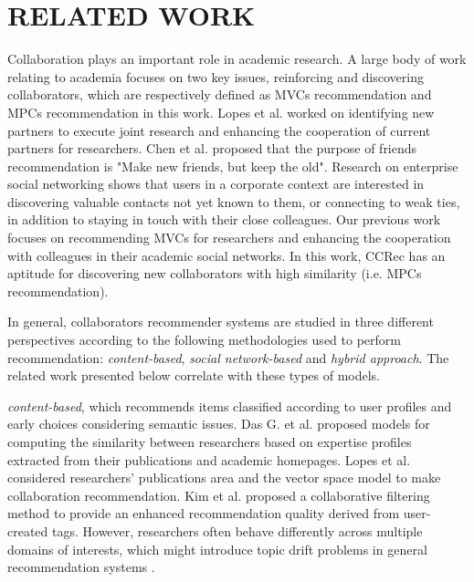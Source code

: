 \documentclass[review]{elsarticle}
\begin{document}
\section{RELATED WORK}
Collaboration plays an important role in academic research. A large body of work relating to academia focuses on two key issues, reinforcing and discovering collaborators, which are respectively defined as MVCs recommendation and MPCs recommendation in this work. Lopes et al. \cite{lopes2010collaboration} worked on identifying new partners to execute joint research and enhancing the cooperation of current partners for researchers. Chen et al. \cite{chen2009make} proposed that the purpose of friends recommendation is "Make new friends, but keep the old". Research on enterprise social networking \cite{dimicco2008motivations} shows that users in a corporate context are interested in discovering valuable contacts not yet known to them, or connecting to weak ties, in addition to staying in touch with their close colleagues. Our previous work \cite{li2014acrec} focuses on recommending MVCs for researchers and enhancing the cooperation with colleagues in their academic social networks. In this work, CCRec has an aptitude for discovering new collaborators with high similarity (i.e. MPCs recommendation).

In general, collaborators recommender systems are studied in three different perspectives according to the following methodologies used to perform recommendation: \emph{content-based}, \emph{social network-based} and \emph{hybrid approach}. The related work presented below correlate with these types of models.

\emph{content-based}, which recommends items classified according to user profiles and early choices considering semantic issues. Das G. et al. \cite{gollapalli2012similar} proposed models for computing the similarity between researchers based on expertise profiles extracted from their publications and academic homepages. Lopes et al. \cite{lopes2010collaboration} considered researchers' publications area and the vector space model to make collaboration recommendation. Kim et al. \cite{kim2010collaborative} proposed a collaborative filtering method to provide an enhanced recommendation quality derived from user-created tags. However, researchers often behave differently across multiple domains of interests, which might introduce topic drift problems in general recommendation systems \cite{tang2012cross}.
\end{document}
